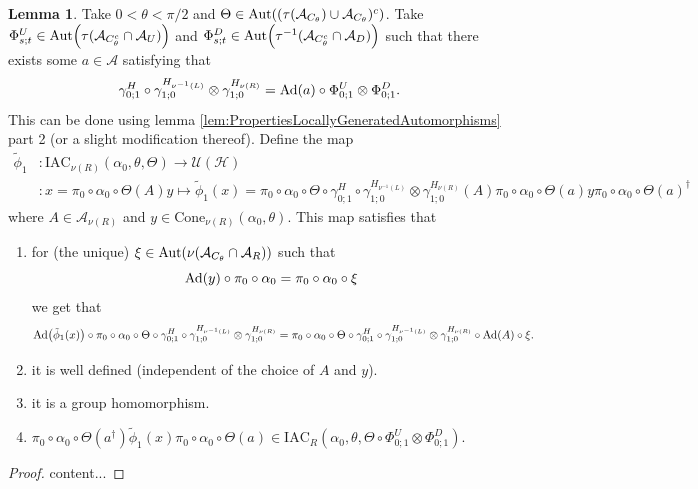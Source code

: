 \documentclass[12pt,a4paper,twoside]{article}
\let\originalleft\left
\let\originalright\right
\renewcommand{\left}{\mathopen{}\mathclose\bgroup\originalleft}
\renewcommand{\right}{\aftergroup\egroup\originalright}
\newcommand{\UU}{\mathcal U}
\newcommand{\HH}{\mathcal H}
\renewcommand{\AA}{\mathcal A}
\newcommand{\Ad}[1]{\textrm{Ad}\left(#1\right)}
\newcommand{\Aut}[1]{\textrm{Aut}\left(#1\right)}
\theoremstyle{definition}
\newtheorem{lemma}[theorem]{Lemma}
\numberwithin{equation}{section}
\begin{document}
\begin{lemma}\label{lem:DefinitionOfGroupMorphismTwoTranslations}
	Take $0<\theta<\pi/2$ and $\Theta\in \Aut{(\tau(\AA_{C_\theta})\cup\AA_{C_\theta})^c}$. Take $\Phi^U_{s;t}\in\Aut{\tau(\AA_{C_\theta^c}\cap\AA_{U})}$ and $\Phi^D_{s;t}\in\Aut{\tau^{-1}(\AA_{C_\theta^c}\cap\AA_{D})}$ such that there exists some $a\in\AA$ satisfying that
	\begin{equation}\label{eq:DefinitionOfGroupMorphismHAutEquationTwoTranslations}
		\gamma^H_{0;1}\circ\gamma^{H_{\nu^{-1}(L)}}_{1;0}\otimes\gamma^{H_{\nu(R)}}_{1;0}=\Ad{a}\circ \Phi^U_{0;1}\otimes\Phi^D_{0;1}.
	\end{equation}
	This can be done using lemma \ref{lem:PropertiesLocallyGeneratedAutomorphisms} part 2 (or a slight modification thereof). Define the map
	\begin{align}
		\tilde\phi_1&:\textrm{IAC}_{\nu(R)}(\alpha_0,\theta,\Theta) \rightarrow \UU(\HH)\\
		\nonumber
		&:x=\pi_0\circ\alpha_0\circ\Theta(A)y\mapsto \tilde\phi_1(x)=\pi_0\circ\alpha_0\circ\Theta\circ\gamma^H_{0;1}\circ\gamma^{H_{\nu^{-1}(L)}}_{1;0}\otimes\gamma^{H_{\nu(R)}}_{1;0}(A)\pi_0\circ\alpha_0\circ\Theta(a)y\pi_0\circ\alpha_0\circ\Theta(a)^\dagger
	\end{align}
	where $A\in\AA_{\nu(R)}$ and $y\in\textrm{Cone}_{\nu(R)}(\alpha_0,\theta)$. This map satisfies that
	\begin{enumerate}
		\item  for (the unique) $\xi\in\Aut{\nu(\AA_{C_\theta}\cap\AA_R)}$ such that
		\begin{equation}
			\Ad{y}\circ\pi_0\circ\alpha_0=\pi_0\circ\alpha_0\circ\xi
		\end{equation}
		we get that
		\begin{equation}\label{eq:ConditionDefinitionOfGroupMorphismTwoTranslations}
			\Ad{\tilde\phi_1(x)}\circ\pi_0\circ\alpha_0\circ\Theta\circ\gamma^H_{0;1}\circ\gamma^{H_{\nu^{-1}(L)}}_{1;0}\otimes\gamma^{H_{\nu(R)}}_{1;0}=\pi_0\circ\alpha_0\circ\Theta\circ\gamma^H_{0;1}\circ\gamma^{H_{\nu^{-1}(L)}}_{1;0}\otimes\gamma^{H_{\nu(R)}}_{1;0}\circ\Ad{A}\circ\xi.
		\end{equation}
		\item it is well defined (independent of the choice of $A$ and $y$).
		\item it is a group homomorphism.
		\item $\pi_0\circ\alpha_0\circ\Theta(a^\dagger)\tilde\phi_1(x)\pi_0\circ\alpha_0\circ\Theta(a)\in\textrm{IAC}_R(\alpha_0,\theta,\Theta\circ \Phi^U_{0;1}\otimes\Phi^D_{0;1})$.
	\end{enumerate}
\end{lemma}
\begin{proof}
	content...
\end{proof}
\appendix
\end{document}
